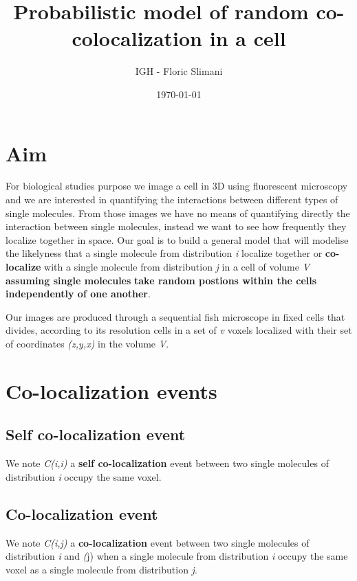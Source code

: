 \documentclass{article}
\title{Probabilistic model of random co-colocalization in a cell}
\author{IGH - Floric Slimani}
\date{\today}
\begin{document}
\maketitle






\section{Aim}
For biological studies purpose we image a cell in 3D using fluorescent microscopy and we are interested in quantifying the 
interactions between different types of single molecules. From those images we have no means of quantifying directly the interaction
between single molecules, instead we want to see how frequently they localize together in space. Our goal is to build a general model
that will modelise the likelyness that a single molecule from distribution \textit{i} localize together or \textbf{co-localize} with
a single molecule from distribution \textit{j} in a cell of volume \textit{V} \textbf{assuming single molecules} 
\textbf{take random postions within the cells independently of one another}.

Our images are produced through a sequential fish microscope in fixed cells that divides, according to its resolution cells in a set of
\textit{v} voxels localized with their set of coordinates \textit{(z,y,x)} in the volume \textit{V}. 












\section{Co-localization events}
\subsection{Self co-localization event}
We note \textit{C(i,i)} a \textbf{self co-localization} event between two single molecules of distribution \textit{i} occupy the same
voxel.

\subsection{Co-localization event}
We note \textit{C(i,j)} a \textbf{co-localization} event between two single molecules of distribution \textit{i} and \textit(j)
when a single molecule from distribution \textit{i} occupy the same voxel as a single molecule from distribution \textit{j}.
\end{document}
